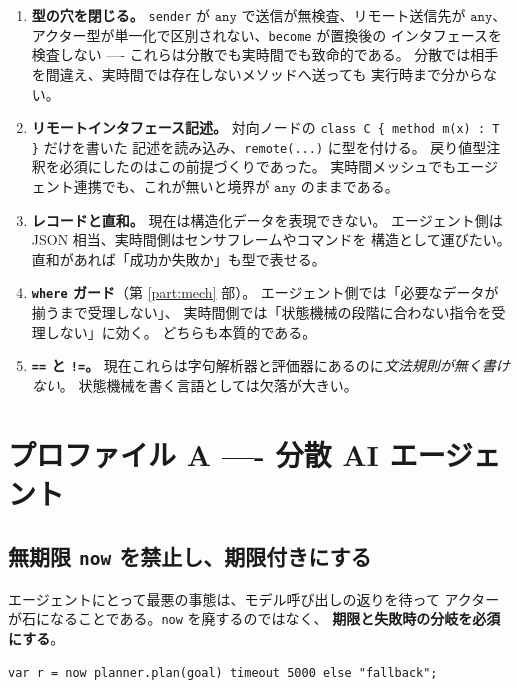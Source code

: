\documentclass[11pt,a4paper]{ltjsarticle}
\theoremstyle{remark}
\newcommand{\ty}[1]{\ensuremath{\mathtt{#1}}}
\begin{document}
\begin{enumerate}
\item \textbf{型の穴を閉じる。}
  \texttt{sender} が \ty{any} で送信が無検査、リモート送信先が \ty{any}、
  アクター型が単一化で区別されない、\texttt{become} が置換後の
  インタフェースを検査しない ---- これらは分散でも実時間でも致命的である。
  分散では相手を間違え、実時間では存在しないメソッドへ送っても
  実行時まで分からない。

\item \textbf{リモートインタフェース記述。}
  対向ノードの \texttt{class C \{ method m(x) : T \}} だけを書いた
  記述を読み込み、\texttt{remote(...)} に型を付ける。
  戻り値型注釈を必須にしたのはこの前提づくりであった。
  実時間メッシュでもエージェント連携でも、これが無いと境界が \ty{any} のままである。

\item \textbf{レコードと直和。}
  現在は構造化データを表現できない。
  エージェント側は JSON 相当、実時間側はセンサフレームやコマンドを
  構造として運びたい。直和があれば「成功か失敗か」も型で表せる。

\item \textbf{\texttt{where} ガード}（第 \ref{part:mech} 部）。
  エージェント側では「必要なデータが揃うまで受理しない」、
  実時間側では「状態機械の段階に合わない指令を受理しない」に効く。
  どちらも本質的である。

\item \textbf{\texttt{==} と \texttt{!=}。}
  現在これらは字句解析器と評価器にあるのに\emph{文法規則が無く書けない}。
  状態機械を書く言語としては欠落が大きい。
\end{enumerate}

\section{プロファイル A ---- 分散 AI エージェント}

\subsection{無期限 \texttt{now} を禁止し、期限付きにする}

エージェントにとって最悪の事態は、モデル呼び出しの返りを待って
アクターが石になることである。\texttt{now} を廃するのではなく、
\textbf{期限と失敗時の分岐を必須にする}。

\begin{lstlisting}[language=AIPL]
var r = now planner.plan(goal) timeout 5000 else "fallback";
\end{lstlisting}
\end{document}
